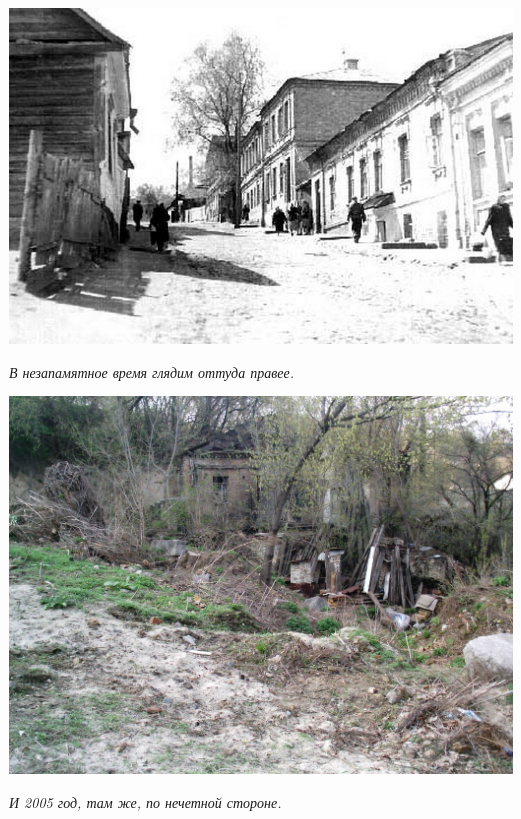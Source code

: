 \newpage
\vspace*{\fill}
\begin{center}
\includegraphics[width=\linewidth]{chast-colebanie-osnov/gora-zamkovaya-valovaya/vozn-drug.jpg}

\textit{В незапамятное время глядим оттуда правее.}
\end{center}


\begin{center}
\includegraphics[width=\linewidth]{chast-colebanie-osnov/gora-zamkovaya-valovaya/imag0024.jpg}

\textit{И 2005 год, там же, по нечетной стороне.}
\end{center}
\vspace*{\fill}
\newpage

